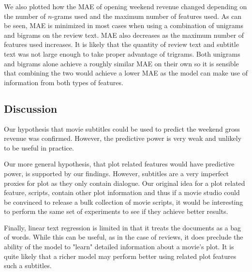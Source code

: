 \documentclass[11pt]{article}
\begin{document}
We also plotted how the MAE of opening weekend revenue changed depending on the number
of $n$-grams used and the maximum number of features used. As can be seen, MAE is minimized
in most cases when using a combination of unigrams and bigrams on the review text. MAE
also decreases as the maximum number of features used increases. It is likely that the
quantity of review text and subtitle text was not large enough to take proper advantage
of trigrams. Both unigrams and bigrams alone achieve a roughly similar MAE on their own
so it is sensible that combining the two would achieve a lower MAE as the model can make
use of information from both types of features.

\subsection{Discussion}
Our hypothesis that movie subtitles could be used to predict the weekend gross revenue
was confirmed. However, the predictive power is very weak and unlikely to be useful in practice. 

Our more general hypothesis, that plot related features would have predictive power,
is supported by our findings.  However, subtitles are a very imperfect proxies for plot
as they only contain dialogue. Our original idea for a plot related feature, scripts,
contain other plot information and thus if a movie studio could be convinced to release a
bulk collection of movie scripts, it would be interesting to perform the same set of
experiments to see if they achieve better results.

Finally, linear text regression is limited in that it treats the documents as a bag of
words. While this can be useful, as in the case of reviews, it does preclude the ability
of the model to "learn" detailed information about a movie's plot. It is quite likely that
a richer model may perform better using related plot features such a subtitles.
\end{document}
